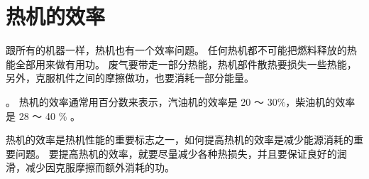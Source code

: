 \section{热机的效率}\label{sec:6-3}

跟所有的机器一样，热机也有一个效率问题。
任何热机都不可能把燃料释放的热能全部用来做有用功。
废气要带走一部分热能，热机部件散热要损失一些热能，
另外，克服机件之间的摩擦做功，也要消耗一部分能量。

。
热机的效率通常用百分数来表示，汽油机的效率是 20 ～ 30\%，柴油机的效率是 28 ～ 40 \% 。

热机的效率是热机性能的重要标志之一，如何提高热机的效率是减少能源消耗的重要问题。
要提高热机的效率，就要尽量减少各种热损失，并且要保证良好的润滑，减少因克服摩擦而额外消耗的功。

